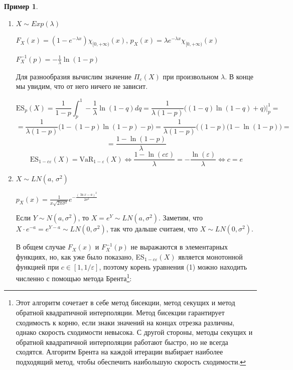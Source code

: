 \documentclass[12pt]{article}
\theoremstyle{plain}
\theoremstyle{definition}
\newtheorem{example}{Пример}[section]
\theoremstyle{remark}
\begin{document}
\begin{example}
\begin{enumerate}
        \[
            \text{ES}_p(X) = \frac{1}{\mathbb{P}(X > \text{VaR}_p(X))}\int_{\text{VaR}_p(X)}^{+\infty}xp_X(x)dx = \frac{1}{1-p}\int_{1/(1-p)^{1/k}}^{+\infty}x\frac{k}{x^{k+1}}dx = 
        \]
        \[
            = \frac{k}{1-p}\frac{1}{(1-k)x^{k-1}}\bigg|^{+\infty}_{1/(1-p)^{1/k}} \overset{k > 1}{=} \frac{k}{1-p}\frac{(1-p)^{(k-1)/k}}{(k-1)} = \frac{k}{(k-1)(1-p)^{1/k}}
        \]
    
        \[
            \text{ES}_{1-c\varepsilon}(X) = \text{VaR}_{1-\varepsilon}(X) \iff \frac{k}{(k-1)(c\varepsilon)^{1/k}} = \frac{1}{\varepsilon^{1/k}} \iff c = \bigg(\frac{k}{k-1}\bigg)^k
        \]

        Это верно при $\varepsilon \leq \bigg(\frac{k}{k-1}\bigg)^{-k}$

    \item $X \sim Exp(\lambda)$

        $F_X(x) = (1 - e^{-\lambda x}) \chi_{[0,+\infty)}(x)$, $p_X(x) = \lambda e^{-\lambda x} \chi_{[0,+\infty)}(x)$

        $F_{X}^{-1}(p)= -\frac{1}{\lambda}\ln(1-p)$

        Для разнообразия вычислим значение $\Pi_\varepsilon(X)$ при произвольном $\lambda$. В конце мы увидим, что от него ничего не зависит.

        \[
            \text{ES}_p(X) = \frac{1}{1-p}\int_p^1-\frac{1}{\lambda}\ln(1-q)dq = \frac{1}{\lambda(1-p)} \bigg((1-q)\ln(1-q)+q\bigg)\bigg|^1_p =
        \]
        \[
            = \frac{1}{\lambda(1-p)} \bigg(1 - (1-p)\ln(1-p)-p\bigg) = \frac{1}{\lambda(1-p)}\bigg((1-p)(1-\ln(1-p)\bigg) = 
        \]
        \[
            = \frac{1-\ln(1-p)}{\lambda}
        \]  
        \[
            \text{ES}_{1-c\varepsilon}(X) = \text{VaR}_{1-\varepsilon}(X) \iff \frac{1 - \ln(c\varepsilon)}{\lambda} = -\frac{\ln(\varepsilon)}{\lambda} \iff c = e
        \]

    \item $X \sim LN(a,\,\sigma^2)$

    $p_X(x) = \frac{1}{x\sqrt{2\pi\sigma^2}}e^{-\frac{(\ln{x}-a)^2}{2\sigma^2}}$
    
    Если $Y \sim N(a, \sigma^2)$, то $X = e^Y \sim LN(a, \sigma^2)$. Заметим, что  $X\cdot e^{-a} = e^{Y - a} \sim LN(0, \sigma^2)$, так что дальше считаем, что $X \sim LN(0, \sigma^2)$.

    
    В общем случае $F_X(x)$ и $F_X^{-1}(p)$ не выражаются в элементарных функциях, но, как уже было показано, ES$_{1-c\varepsilon}(X)$ является монотонной функцией при $c \in [1, 1/\varepsilon]$, поэтому корень уравнения (1) можно находить численно с помощью метода Брента\footnote{Этот алгоритм сочетает в себе метод бисекции, метод секущих и метод обратной квадратичной интерполяции. Метод бисекции гарантирует сходимость к корню, если знаки значений на концах отрезка различны, однако скорость сходимости невысока. С другой стороны, методы секущих и обратной квадратичной интерполяции работают быстро, но не всегда сходятся. Алгоритм Брента на каждой итерации выбирает наиболее подходящий метод, чтобы обеспечить наибольшую скорость сходимости.}:
    

\end{enumerate}
\end{example}
\end{document}
